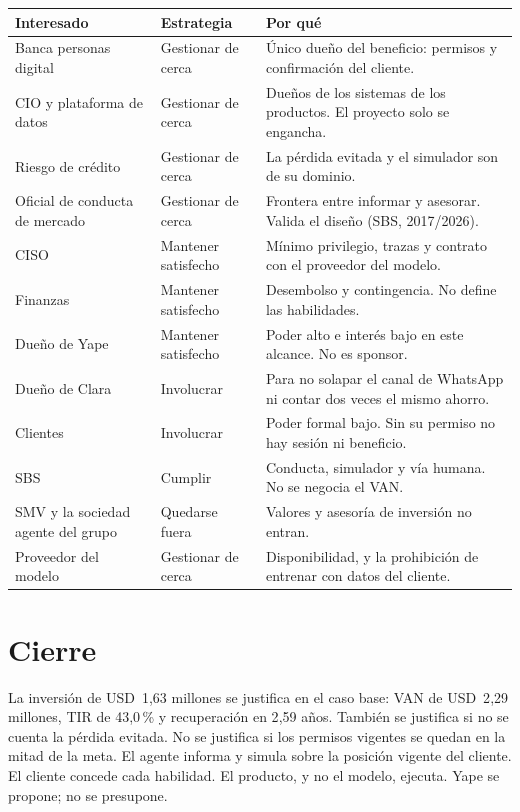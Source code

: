 \documentclass[11pt]{article}
\newcommand{\usd}[1]{USD~#1}
\begin{document}
\begin{table}[ht]
\centering
\small
\begin{tabularx}{\textwidth}{@{}l l X@{}}
\toprule
\textbf{Interesado} & \textbf{Estrategia} & \textbf{Por qué} \\
\midrule
Banca personas digital & Gestionar de cerca & Único dueño del beneficio: permisos y confirmación del cliente. \\
CIO y plataforma de datos & Gestionar de cerca & Dueños de los sistemas de los productos. El proyecto solo se engancha. \\
Riesgo de crédito & Gestionar de cerca & La pérdida evitada y el simulador son de su dominio. \\
Oficial de conducta de mercado & Gestionar de cerca & Frontera entre informar y asesorar. Valida el diseño (SBS, 2017/2026). \\
CISO & Mantener satisfecho & Mínimo privilegio, trazas y contrato con el proveedor del modelo. \\
Finanzas & Mantener satisfecho & Desembolso y contingencia. No define las habilidades. \\
Dueño de Yape & Mantener satisfecho & Poder alto e interés bajo en este alcance. No es sponsor. \\
Dueño de Clara & Involucrar & Para no solapar el canal de WhatsApp ni contar dos veces el mismo ahorro. \\
Clientes & Involucrar & Poder formal bajo. Sin su permiso no hay sesión ni beneficio. \\
SBS & Cumplir & Conducta, simulador y vía humana. No se negocia el VAN. \\
SMV y la sociedad agente del grupo & Quedarse fuera & Valores y asesoría de inversión no entran. \\
Proveedor del modelo & Gestionar de cerca & Disponibilidad, y la prohibición de entrenar con datos del cliente. \\
\bottomrule
\end{tabularx}
\end{table}

\section{Cierre}

La inversión de \usd{1{,}63} millones se justifica en el caso base: VAN de \usd{2{,}29} millones, TIR de 43{,}0\,\% y recuperación en 2{,}59 años. También se justifica si no se cuenta la pérdida evitada. No se justifica si los permisos vigentes se quedan en la mitad de la meta. El agente informa y simula sobre la posición vigente del cliente. El cliente concede cada habilidad. El producto, y no el modelo, ejecuta. Yape se propone; no se presupone.
\end{document}
